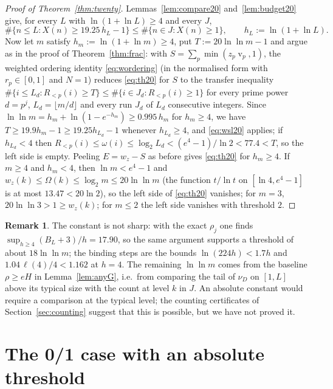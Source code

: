 \documentclass[11pt]{article}
\theoremstyle{definition}
\newtheorem{remark}[theorem]{Remark}
\DeclareMathOperator{\vp}{v}
\begin{document}
\begin{proof}[Proof of Theorem~\ref{thm:twenty}]
Lemmas~\ref{lem:compare20} and~\ref{lem:budget20} give, for every $L$ with $\ln(1+\ln L)\ge4$ and every $J$,
\begin{equation}\label{eq:wsl20}
\#\{n\le L:X(n)\ge19.25\,h_L-1\}\le\#\{n\in J:X(n)\ge1\},\qquad h_L:=\ln(1+\ln L).
\end{equation}
Now let $m$ satisfy $h_m:=\ln(1+\ln m)\ge4$, put $T:=20\ln\ln m-1$ and argue as in the proof of Theorem~\ref{thm:frac}: with
$S=\sum_p\min(z_p\vp_p,1)$, the weighted ordering identity \eqref{eq:wordering} (in the normalised form with $r_p\in[0,1]$ and
$N=1$) reduces \eqref{eq:th20} for $S$ to the transfer inequality $\#\{i\le L_d:R_{<p}(i)\ge T\}\le\#\{i\in J_d:R_{<p}(i)\ge1\}$ for
every prime power $d=p^j$, $L_d=\lfloor m/d\rfloor$ and every run $J_d$ of $L_d$ consecutive integers. Since
$\ln\ln m=h_m+\ln(1-e^{-h_m})\ge0.995\,h_m$ for $h_m\ge4$, we have $T\ge19.9h_m-1\ge19.25h_{L_d}-1$ whenever $h_{L_d}\ge4$, and
\eqref{eq:wsl20} applies; if $h_{L_d}<4$ then $R_{<p}(i)\le\omega(i)\le\log_2L_d<(e^4-1)/\ln2<77.4<T$, so the left side is
empty. Peeling $E=w_z-S$ as before gives \eqref{eq:th20} for $h_m\ge4$. If $m\ge4$ and $h_m<4$, then $\ln m<e^4-1$ and
$w_z(k)\le\Omega(k)\le\log_2m\le20\ln\ln m$ (the function $t/\ln t$ on $[\ln4,e^4-1]$ is at most $13.47<20\ln2$), so the left side
of \eqref{eq:th20} vanishes; for $m=3$, $20\ln\ln3>1\ge w_z(k)$; for $m\le2$ the left side vanishes with threshold $2$.
\end{proof}

\begin{remark}
The constant is not sharp: with the exact $\rho_j$ one finds $\sup_{h\ge4}(B_L+3)/h=17.90$, so the same argument supports a
threshold of about $18\ln\ln m$; the binding steps are the bounds $\ln(224h)<1.7h$ and $1.04\,\ell(4)/4<1.162$ at $h=4$.
The remaining $\ln\ln m$ comes from the baseline $\rho\ge eH$ in Lemma~\ref{lem:anyG}, i.e.\ from comparing the tail of
$\nu_D$ on $[1,L]$ above its typical size with the count at level $k$ in $J$. An absolute constant would require a comparison
at the typical level; the counting certificates of Section~\ref{sec:counting} suggest that this is possible, but we have not
proved it.
\end{remark}

\section{The 0/1 case with an absolute threshold}\label{sec:four}
\end{document}
